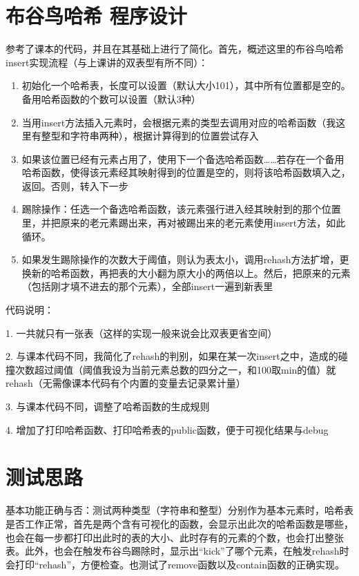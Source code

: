 \documentclass[UTF8]{ctexart}
\begin{document}
\pagestyle{fancy}
\fancyhead{}

\section{布谷鸟哈希 程序设计}

参考了课本的代码，并且在其基础上进行了简化。首先，概述这里的布谷鸟哈希insert实现流程（与上课讲的双表型有所不同）：

\begin{enumerate}

  \item 初始化一个哈希表，长度可以设置（默认大小101），其中所有位置都是空的。备用哈希函数的个数可以设置（默认3种）
  \item 当用insert方法插入元素时，会根据元素的类型去调用对应的哈希函数（我这里有整型和字符串两种），根据计算得到的位置尝试存入
  \item 如果该位置已经有元素占用了，使用下一个备选哈希函数……若存在一个备用哈希函数，使得该元素经其映射得到的位置是空的，则将该哈希函数填入之，返回。否则，转入下一步
  \item 踢除操作：任选一个备选哈希函数，该元素强行进入经其映射到的那个位置里，并把原来的老元素踢出来，再对被踢出来的老元素使用insert方法，如此循环。
  \item 如果发生踢除操作的次数大于阈值，则认为表太小，调用rehash方法扩增，更换新的哈希函数，再把表的大小翻为原大小的两倍以上。然后，把原来的元素（包括刚才填不进去的那个元素），全部insert一遍到新表里

\end{enumerate}

代码说明：

1. 一共就只有一张表（这样的实现一般来说会比双表更省空间）

2. 与课本代码不同，我简化了rehash的判别，如果在某一次insert之中，造成的碰撞次数超过阈值（阈值我设为当前元素总数的四分之一，和100取min的值）就rehash（无需像课本代码有个内置的变量去记录累计量）

3. 与课本代码不同，调整了哈希函数的生成规则

4. 增加了打印哈希函数、打印哈希表的public函数，便于可视化结果与debug


\section{测试思路}

基本功能正确与否：测试两种类型（字符串和整型）分别作为基本元素时，哈希表是否工作正常，首先是两个含有可视化的函数，会显示出此次的哈希函数是哪些，也会在每一步都打印出此时的表的大小、此时存有的元素的个数，也会打出整张表。此外，也会在触发布谷鸟踢除时，显示出“kick”了哪个元素，在触发rehash时会打印“rehash”，方便检查。也测试了remove函数以及contain函数的正确实现。
\end{document}
